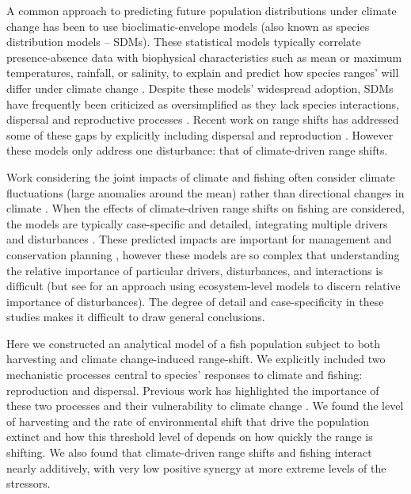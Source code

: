 \documentclass[12pt,english]{article}
\begin{document}
\begin{spacing}{1.9}
\begin{flushleft}
A common approach to predicting future population distributions under climate change has been to use bioclimatic-envelope models (also known as species distribution models -- SDMs). These statistical models typically correlate presence-absence data with biophysical characteristics such as mean or maximum temperatures, rainfall, or salinity, to explain and predict how species ranges' will differ under climate change \citep{Elithetal2006, GuisanThuiller2005, GuisanZimmerman2000}. Despite these models' widespread adoption, SDMs have frequently been criticized as oversimplified as they lack species interactions, dispersal and reproductive processes \citep{KearneyPorter2009, Zarnetskeetal2012, Robinsonetal2011}.  Recent work on range shifts has addressed some of these gaps by explicitly including dispersal and reproduction \citep{Berestyckietal2009, ZhouKot2011}. However these models only address one disturbance: that of climate-driven range shifts. 

Work considering the joint impacts of climate and fishing often consider climate fluctuations (large anomalies around the mean) rather than directional changes in climate \citep{WaltersParma1996, KingMcFarlane2006}. When the effects of climate-driven range shifts on fishing are considered, the models are typically case-specific and detailed, integrating multiple drivers and disturbances \citep{Cheungetal2010, Lindegrenetal2010, Brownetal2010, Merinoetal2010, Merinoetal2010b, Plaganyietal2011, Ainsworthetal2011, Zhangetal2011, Barangeetal2011, Howardetal2013}. These predicted impacts are important for management and conservation planning \citep{Allisonetal2009}, however these models are so complex that understanding the relative importance of particular drivers, disturbances, and interactions is difficult (but see \citet{Nyeetal2013} for an approach using ecosystem-level models to discern relative importance of disturbances).  The degree of detail and case-specificity in these studies makes it difficult to draw general conclusions. 

Here we constructed an analytical model of a fish population subject to both harvesting and climate change-induced range-shift. We explicitly included two mechanistic processes central to species' responses to climate and fishing: reproduction and dispersal. Previous work has highlighted the importance of these two processes and their vulnerability to climate change \citep{Fordhametal2013, Hastingsetal2005}.  We found the level of harvesting and the rate of environmental shift that drive the population extinct and how this threshold level of depends on how quickly the range is shifting.  We also found that climate-driven range shifts and fishing interact nearly additively, with very low positive synergy at more extreme levels of the stressors.  


\end{flushleft}
\end{spacing}
\end{document}

